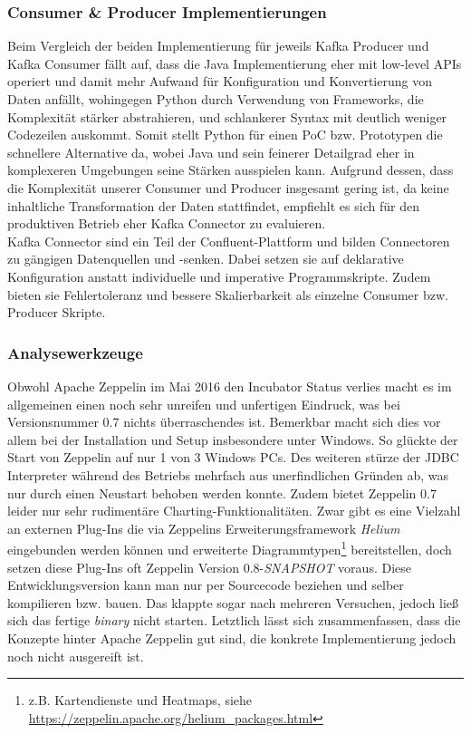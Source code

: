 \subsubsection{Consumer \& Producer Implementierungen}
Beim Vergleich der beiden Implementierung für jeweils Kafka Producer und Kafka Consumer fällt auf, dass die Java Implementierung eher mit low-level APIs operiert und damit mehr Aufwand für Konfiguration und Konvertierung von Daten anfällt, wohingegen Python durch Verwendung von Frameworks, die Komplexität stärker abstrahieren, und schlankerer Syntax mit deutlich weniger Codezeilen auskommt. Somit stellt Python für einen PoC bzw. Prototypen die schnellere Alternative da, wobei Java und sein feinerer Detailgrad eher in komplexeren Umgebungen seine Stärken ausspielen kann.\newline
Aufgrund dessen, dass die Komplexität unserer Consumer und Producer insgesamt gering ist, da keine inhaltliche Transformation der Daten stattfindet, empfiehlt es sich für den produktiven Betrieb eher Kafka Connector zu evaluieren.\\
Kafka Connector sind ein  Teil der Confluent-Plattform und bilden Connectoren zu gängigen Datenquellen und -senken. Dabei setzen sie auf deklarative Konfiguration anstatt individuelle und imperative Programmskripte. Zudem bieten sie Fehlertoleranz und bessere Skalierbarkeit als einzelne Consumer bzw. Producer Skripte.

\subsubsection{Analysewerkzeuge}
Obwohl Apache Zeppelin im Mai 2016 den Incubator Status verlies macht es im allgemeinen einen noch sehr unreifen und unfertigen Eindruck,
was bei Versionsnummer 0.7 nichts überraschendes ist.
Bemerkbar macht sich dies vor allem bei der Installation und Setup insbesondere unter Windows.
So glückte der Start von Zeppelin auf nur 1 von 3 Windows PCs.
Des weiteren stürze der JDBC Interpreter während des Betriebs mehrfach aus unerfindlichen Gründen ab, was nur durch einen Neustart behoben werden konnte.
Zudem bietet Zeppelin 0.7 leider nur sehr rudimentäre Charting-Funktionalitäten.
Zwar gibt es eine Vielzahl an externen Plug-Ins die via Zeppelins Erweiterungsframework \textit{Helium} eingebunden werden können und erweiterte Diagrammtypen\footnote{z.B. Kartendienste und  Heatmaps, siehe \href{https://zeppelin.apache.org/helium_packages.html}{https://zeppelin.apache.org/helium\_packages.html} } bereitstellen, doch setzen diese Plug-Ins oft Zeppelin Version 0.8-\textit{SNAPSHOT} voraus. Diese Entwicklungsversion kann man nur per Sourcecode beziehen und selber kompilieren bzw. bauen.
Das klappte sogar nach mehreren Versuchen, jedoch ließ sich das fertige \textit{binary} nicht starten.\newline
Letztlich lässt sich zusammenfassen, dass die Konzepte hinter Apache Zeppelin gut sind, die konkrete Implementierung jedoch noch nicht ausgereift ist.

